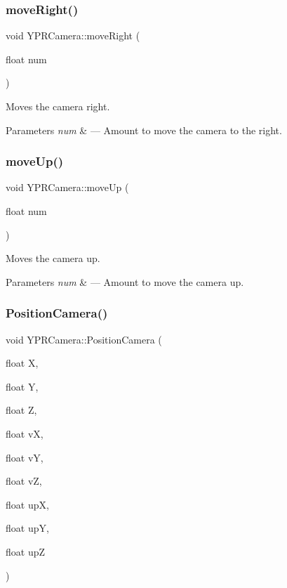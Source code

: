 \subsubsection{\texorpdfstring{move\+Right()}{moveRight()}}
{\footnotesize\ttfamily void Y\+P\+R\+Camera\+::move\+Right (\begin{DoxyParamCaption}\item[{float}]{num }\end{DoxyParamCaption})}



Moves the camera right. 


\begin{DoxyParams}{Parameters}
{\em num} & --- Amount to move the camera to the right. \\
\hline
\end{DoxyParams}
\mbox{\label{class_y_p_r_camera_a37f3668e2f09ec2f7004d016844b468e}} 
\subsubsection{\texorpdfstring{move\+Up()}{moveUp()}}
{\footnotesize\ttfamily void Y\+P\+R\+Camera\+::move\+Up (\begin{DoxyParamCaption}\item[{float}]{num }\end{DoxyParamCaption})}



Moves the camera up. 


\begin{DoxyParams}{Parameters}
{\em num} & --- Amount to move the camera up. \\
\hline
\end{DoxyParams}
\mbox{\label{class_y_p_r_camera_a82b133d21e8ea170a7877553ad243621}} 
\subsubsection{\texorpdfstring{Position\+Camera()}{PositionCamera()}\hspace{0.1cm}{\footnotesize\ttfamily [1/2]}}
{\footnotesize\ttfamily void Y\+P\+R\+Camera\+::\+Position\+Camera (\begin{DoxyParamCaption}\item[{float}]{X,  }\item[{float}]{Y,  }\item[{float}]{Z,  }\item[{float}]{vX,  }\item[{float}]{vY,  }\item[{float}]{vZ,  }\item[{float}]{upX,  }\item[{float}]{upY,  }\item[{float}]{upZ }\end{DoxyParamCaption})}



